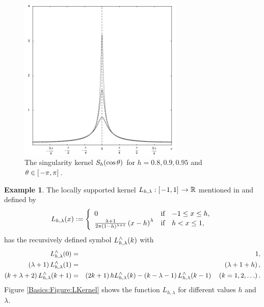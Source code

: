 \documentclass[11pt,a4paper,twoside,bibtotoc]{scrartcl}
\theoremstyle{plain}
\theoremstyle{definition}
\newtheorem{example}[theorem]{Example}
\theoremstyle{remark}
\numberwithin{equation}{section}
\numberwithin{table}{section}
\numberwithin{figure}{section}
\begin{document}
\begin{figure}[tbp]
  \centering
  \includegraphics[width=0.7\textwidth]{images/singularity}
  \caption{The singularity kernel $S_{h}{\hspace{-0.4ex}}\left(\cos\theta\right)$ for $h = 0.8,0.9,0.95$ and $\theta \in \left[\left.-\pi,\pi\right]\right.$.}
  \label{Basics:Figure:SingularityKernel}
\end{figure}

\begin{example}
  The locally supported kernel $L_{h,\lambda}: \left[\left.-1,1\right]\right. \rightarrow \mathbb{R}$ mentioned in \cite{frsc} and defined by
  \[
    \fun{L_{h,\lambda}}{x} := 
      \left\{\begin{array}{l@{\quad \text{if} \quad}l} 
                                              0 & -1 \le x \le h, \\
        \frac{\lambda+1}{2\pi(1-h)^{\lambda+1}}\paren{x-h}^{\lambda} &  h   < x \le 1,
      \end{array}\right.
  \]
  has the recursively defined symbol $L_{h,\lambda}^{\wedge}{\hspace{-0.4ex}}\left(k\right)$ with
\begin{eqnarray*}
    L_{h,\lambda}^{\wedge}{\hspace{-0.4ex}}\left(0\right) & = & 1,\\
    \left(\lambda+1\right) L_{h,\lambda}^{\wedge}{\hspace{-0.4ex}}\left(1\right) & = & \left(\lambda + 1 + h\right),\\
    \left(k+\lambda+2\right) L_{h,\lambda}^{\wedge}{\hspace{-0.4ex}}\left(k+1\right) & = & \left(2k+1\right) h L_{h,\lambda}^{\wedge}{\hspace{-0.4ex}}\left(k\right) - \left(k-\lambda-1\right) L_{h,\lambda}^{\wedge}{\hspace{-0.4ex}}\left(k-1\right) 
    \quad \left(k = 1,2,\ldots\right).
\end{eqnarray*}
  Figure \ref{Basics:Figure:LKernel} shows the function $L_{h,\lambda}$ for different values $h$ and $\lambda$.
\end{example}
\end{document}
